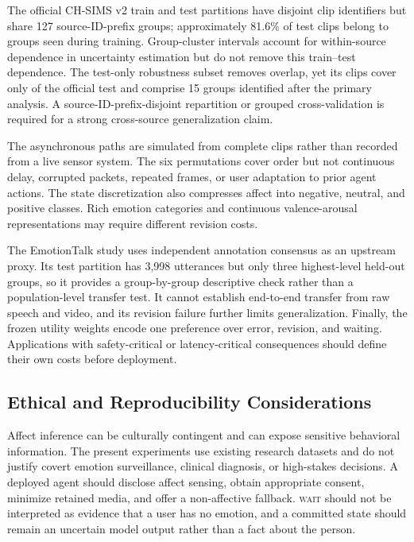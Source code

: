 \documentclass[journal]{IEEEtran}
\begin{document}
The official CH-SIMS v2 train and test partitions have disjoint clip identifiers but share 127 source-ID-prefix groups; approximately 81.6\% of test clips belong to groups seen during training. Group-cluster intervals account for within-source dependence in uncertainty estimation but do not remove this train--test dependence. The test-only robustness subset removes overlap, yet its \SourceDisjointClips{} clips cover only \SourceDisjointFraction{} of the official test and comprise 15 groups identified after the primary analysis. A source-ID-prefix-disjoint repartition or grouped cross-validation is required for a strong cross-source generalization claim.

The asynchronous paths are simulated from complete clips rather than recorded from a live sensor system. The six permutations cover order but not continuous delay, corrupted packets, repeated frames, or user adaptation to prior agent actions. The state discretization also compresses affect into negative, neutral, and positive classes. Rich emotion categories and continuous valence-arousal representations may require different revision costs.

The EmotionTalk study uses independent annotation consensus as an upstream proxy. Its test partition has 3,998 utterances but only three highest-level held-out groups, so it provides a group-by-group descriptive check rather than a population-level transfer test. It cannot establish end-to-end transfer from raw speech and video, and its revision failure further limits generalization. Finally, the frozen utility weights encode one preference over error, revision, and waiting. Applications with safety-critical or latency-critical consequences should define their own costs before deployment.

\subsection{Ethical and Reproducibility Considerations}

Affect inference can be culturally contingent and can expose sensitive behavioral information. The present experiments use existing research datasets and do not justify covert emotion surveillance, clinical diagnosis, or high-stakes decisions. A deployed agent should disclose affect sensing, obtain appropriate consent, minimize retained media, and offer a non-affective fallback. \textsc{wait} should not be interpreted as evidence that a user has no emotion, and a committed state should remain an uncertain model output rather than a fact about the person.
\end{document}
